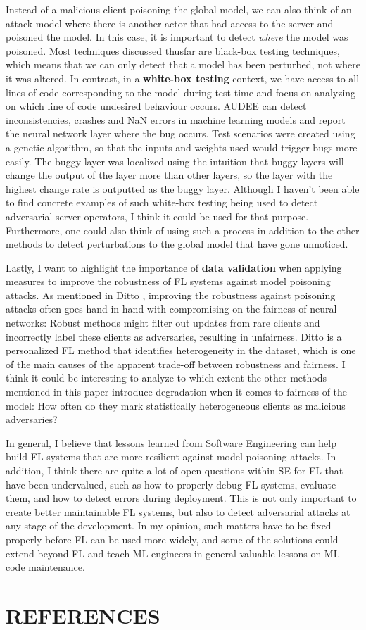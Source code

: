 \documentclass[11pt]{article}
\begin{document}
Instead of a malicious client poisoning the global model, we can also think of an attack model where there is another actor that had access to the server and poisoned the model. In this case, it is important to detect \textit{where} the model was poisoned. Most techniques discussed thusfar are black-box testing techniques, which means that we can only detect that a model has been perturbed, not where it was altered. In contrast, in a \textbf{white-box testing} context, we have access to all lines of code corresponding to the model during test time and focus on analyzing on which line of code undesired behaviour occurs. AUDEE \cite{guo2020audee} can detect inconsistencies, crashes and NaN errors in machine learning models and report the neural network layer where the bug occurs. Test scenarios were created using a genetic algorithm, so that the inputs and weights used would trigger bugs more easily. The buggy layer was localized using the intuition that buggy layers will change the output of the layer more than other layers, so the layer with the highest change rate is outputted as the buggy layer. Although I haven't been able to find concrete examples of such white-box testing being used to detect adversarial server operators, I think it could be used for that purpose. Furthermore, one could also think of using such a process in addition to the other methods to detect perturbations to the global model that have gone unnoticed. 

Lastly, I want to highlight the importance of \textbf{data validation} when applying measures to improve the robustness of FL systems against model poisoning attacks. As mentioned in Ditto \cite{li2021ditto}, improving the robustness against poisoning attacks often goes hand in hand with compromising on the fairness of neural networks: Robust methods might filter out updates from rare clients and incorrectly label these clients as adversaries, resulting in unfairness. Ditto is a personalized FL method that identifies heterogeneity in the dataset, which is one of the main causes of the apparent trade-off between robustness and fairness. I think it could be interesting to analyze to which extent the other methods mentioned in this paper introduce degradation when it comes to fairness of the model: How often do they mark statistically heterogeneous clients as malicious adversaries? 

In general, I believe that lessons learned from Software Engineering can help build FL systems that are more resilient against model poisoning attacks. In addition, I think there are quite a lot of open questions within SE for FL that have been undervalued, such as how to properly debug FL systems, evaluate them, and how to detect errors during deployment. This is not only important to create better maintainable FL systems, but also to detect adversarial attacks at any stage of the development. In my opinion, such matters have to be fixed properly before FL can be used more widely, and some of the solutions could extend beyond FL and teach ML engineers in general valuable lessons on ML code maintenance. 

\section*{REFERENCES}


\end{document}
